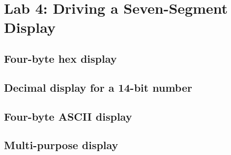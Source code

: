 \chapter{Lab 4: Driving a Seven-Segment Display} \label{day4}

\section{Four-byte hex display}





\section{Decimal display for a 14-bit number}



\section{Four-byte ASCII display}



\section{Multi-purpose display}









